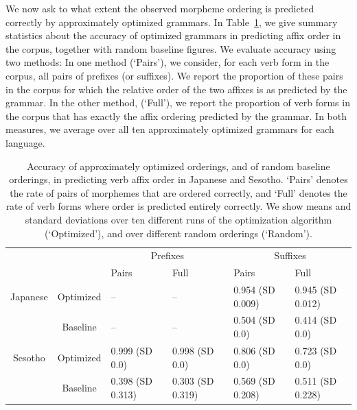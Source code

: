 We now ask to what extent the observed morpheme ordering is predicted correctly by approximately optimized grammars.
In Table~\ref{tab:morph-acc}, we give summary statistics about the accuracy of optimized grammars in predicting affix order in the corpus, together with random baseline figures.
We evaluate accuracy using two methods:
In one method (`Pairs'), we consider, for each verb form in the corpus, all pairs of prefixes (or suffixes).
We report the proportion of these pairs in the corpus for which the relative order of the two affixes is as predicted by the grammar.
In the other method, (`Full'), we report the proportion of verb forms in the corpus that has exactly the affix ordering predicted by the grammar.
In both measures, we average over all ten approximately optimized grammars for each language.

\begin{table}
\begin{tabular}{cc||ll|ll}
             &              & \multicolumn{2}{c}{Prefixes}    & \multicolumn{2}{|c}{Suffixes} \\
             &              & Pairs & Full & Pairs & Full \\ \hline\hline
Japanese & Optimized  & -- &  -- &   0.954 (SD 0.009) & 0.945 (SD 0.012) \\ 
& Baseline    & -- & -- & 0.504 (SD 0.0) & 0.414 (SD 0.0) \\ \hline
Sesotho &   Optimized  &  0.999 (SD 0.0) & 0.998 (SD 0.0) & 0.806 (SD 0.0) & 0.723 (SD 0.0) \\
        &   Baseline  &  0.398 (SD 0.313) & 0.303 (SD 0.319) & 0.569 (SD 0.208) & 0.511 (SD 0.228) \\
\end{tabular}
\caption{Accuracy of approximately optimized orderings, and of random baseline orderings, in predicting verb affix order in Japanese and Sesotho. `Pairs' denotes the rate of pairs of morphemes that are ordered correctly, and `Full' denotes the rate of verb forms where order is predicted entirely correctly. We show means and standard deviations over ten different runs of the optimization algorithm (`Optimized'), and over different random orderings (`Random').}\label{tab:morph-acc}
\end{table}

